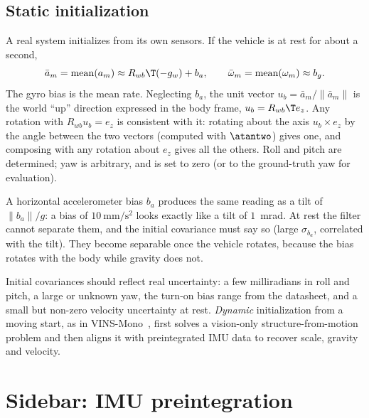 \subsection{Static initialization}

A real system initializes from its own sensors. If the vehicle is at rest for about a second,
\begin{equation}
  \bar a_m = \mathrm{mean}(a_m) \approx R_{wb}\T(-g_w) + b_a, \qquad \bar\omega_m = \mathrm{mean}(\omega_m) \approx b_g .
\end{equation}
The gyro bias is the mean rate. Neglecting $b_a$, the unit vector $u_b = \bar a_m/\|\bar a_m\|$ is the world
``up'' direction expressed in the body frame, $u_b = R_{wb}\T e_z$. Any rotation with $R_{wb}u_b = e_z$ is consistent
with it: rotating about the axis $u_b\times e_z$ by the angle between the two vectors (computed with
$\atantwo$) gives one, and composing with any rotation about $e_z$ gives all the others. Roll and pitch are
determined; yaw is arbitrary, and is set to zero (or to the ground-truth yaw for evaluation).

\begin{pitfall}
A horizontal accelerometer bias $b_a$ produces the same reading as a tilt of $\|b_a\|/g$: a bias of
$10~\mathrm{mm/s^2}$ looks exactly like a tilt of $1$~mrad. At rest the filter cannot separate them, and the initial
covariance must say so (large $\sigma_{b_a}$, correlated with the tilt). They become separable once the vehicle
rotates, because the bias rotates with the body while gravity does not.
\end{pitfall}

Initial covariances should reflect real uncertainty: a few milliradians in roll and pitch, a large or
unknown yaw, the turn-on bias range from the datasheet, and a small but non-zero velocity uncertainty at rest.
\emph{Dynamic} initialization from a moving start, as in VINS-Mono~\cite{qin2018vins}, first solves a
vision-only structure-from-motion problem and then aligns it with preintegrated IMU data to recover scale,
gravity and velocity.

\section{Sidebar: IMU preintegration}

